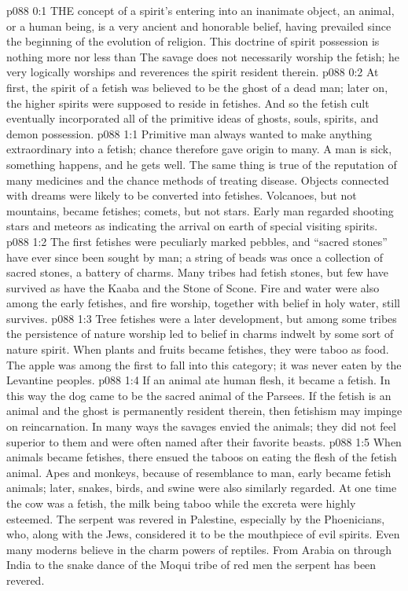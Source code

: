 \vs p088 0:1 THE concept of a spirit’s entering into an inanimate object, an animal, or a human being, is a very ancient and honorable belief, having prevailed since the beginning of the evolution of religion. This doctrine of spirit possession is nothing more nor less than  The savage does not necessarily worship the fetish; he very logically worships and reverences the spirit resident therein.
\vs p088 0:2 At first, the spirit of a fetish was believed to be the ghost of a dead man; later on, the higher spirits were supposed to reside in fetishes. And so the fetish cult eventually incorporated all of the primitive ideas of ghosts, souls, spirits, and demon possession.
\vs p088 1:1 Primitive man always wanted to make anything extraordinary into a fetish; chance therefore gave origin to many. A man is sick, something happens, and he gets well. The same thing is true of the reputation of many medicines and the chance methods of treating disease. Objects connected with dreams were likely to be converted into fetishes. Volcanoes, but not mountains, became fetishes; comets, but not stars. Early man regarded shooting stars and meteors as indicating the arrival on earth of special visiting spirits.
\vs p088 1:2 The first fetishes were peculiarly marked pebbles, and “sacred stones” have ever since been sought by man; a string of beads was once a collection of sacred stones, a battery of charms. Many tribes had fetish stones, but few have survived as have the Kaaba and the Stone of Scone. Fire and water were also among the early fetishes, and fire worship, together with belief in holy water, still survives.
\vs p088 1:3 Tree fetishes were a later development, but among some tribes the persistence of nature worship led to belief in charms indwelt by some sort of nature spirit. When plants and fruits became fetishes, they were taboo as food. The apple was among the first to fall into this category; it was never eaten by the Levantine peoples.
\vs p088 1:4 If an animal ate human flesh, it became a fetish. In this way the dog came to be the sacred animal of the Parsees. If the fetish is an animal and the ghost is permanently resident therein, then fetishism may impinge on reincarnation. In many ways the savages envied the animals; they did not feel superior to them and were often named after their favorite beasts.
\vs p088 1:5 When animals became fetishes, there ensued the taboos on eating the flesh of the fetish animal. Apes and monkeys, because of resemblance to man, early became fetish animals; later, snakes, birds, and swine were also similarly regarded. At one time the cow was a fetish, the milk being taboo while the excreta were highly esteemed. The serpent was revered in Palestine, especially by the Phoenicians, who, along with the Jews, considered it to be the mouthpiece of evil spirits. Even many moderns believe in the charm powers of reptiles. From Arabia on through India to the snake dance of the Moqui tribe of red men the serpent has been revered.
